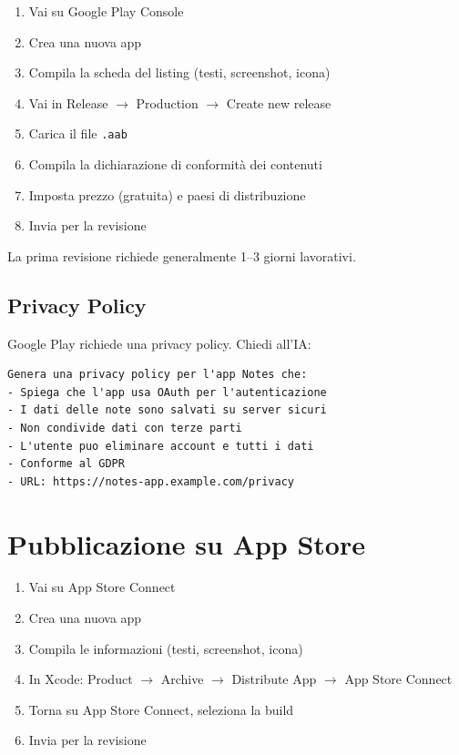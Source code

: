 \begin{enumerate}
  \item Vai su Google Play Console
  \item Crea una nuova app
  \item Compila la scheda del listing (testi, screenshot, icona)
  \item Vai in Release $\rightarrow$ Production $\rightarrow$ Create new release
  \item Carica il file \texttt{.aab}
  \item Compila la dichiarazione di conformità dei contenuti
  \item Imposta prezzo (gratuita) e paesi di distribuzione
  \item Invia per la revisione
\end{enumerate}

La prima revisione richiede generalmente 1--3 giorni lavorativi.

\subsection{Privacy Policy}

Google Play richiede una privacy policy. Chiedi all'IA:

\begin{praticabox}[title={Pratica --- Privacy policy}]
\begin{lstlisting}[language={}]
Genera una privacy policy per l'app Notes che:
- Spiega che l'app usa OAuth per l'autenticazione
- I dati delle note sono salvati su server sicuri
- Non condivide dati con terze parti
- L'utente puo eliminare account e tutti i dati
- Conforme al GDPR
- URL: https://notes-app.example.com/privacy
\end{lstlisting}
\end{praticabox}

\section{Pubblicazione su App Store}

\begin{enumerate}
  \item Vai su App Store Connect
  \item Crea una nuova app
  \item Compila le informazioni (testi, screenshot, icona)
  \item In Xcode: Product $\rightarrow$ Archive $\rightarrow$ Distribute App $\rightarrow$ App Store Connect
  \item Torna su App Store Connect, seleziona la build
  \item Invia per la revisione
\end{enumerate}

